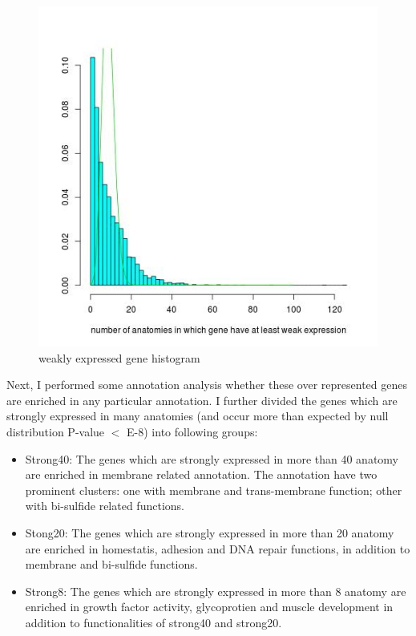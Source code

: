 \documentclass{article}
\begin{document}
\begin{figure}
	\begin{center}
		\includegraphics[scale=0.5]{weaklyExpressed.jpg}
	\end{center}
	\caption{weakly expressed gene histogram}
	\label{fig:weaklyHist}
\end{figure}

Next, I performed some annotation analysis whether these over represented genes are enriched in any particular annotation. I further divided the genes which are strongly expressed in many anatomies (and occur more than expected by null distribution P-value $<$ E-8) into following groups:
\begin{itemize}
	\item Strong40: The genes which are strongly expressed in more than 40 anatomy are enriched in membrane
		related annotation. The annotation have two prominent clusters: one with membrane and trans-membrane function; other with bi-sulfide  related functions.
	\item  Stong20: The genes which are strongly expressed in more than 20 anatomy are enriched in homestatis, adhesion and DNA repair functions,
		in addition to membrane and bi-sulfide functions.
	\item  Strong8: The genes which are strongly expressed in more than 8 anatomy are enriched in growth factor activity, glycoprotien and muscle 
		development
		in addition to functionalities of strong40 and strong20.
\end{itemize}
\end{document}
